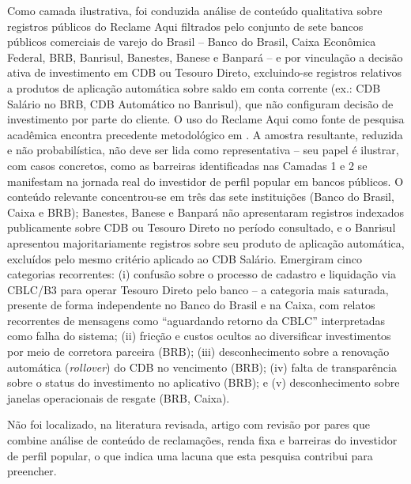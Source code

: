 Como camada ilustrativa, foi conduzida an\'alise de conte\'udo qualitativa
\autocite{bardin2011} sobre registros p\'ublicos do Reclame Aqui filtrados
pelo conjunto de sete bancos p\'ublicos comerciais de varejo do Brasil --
Banco do Brasil, Caixa Econ\^omica Federal, BRB, Banrisul, Banestes,
Banese e Banpar\'a -- e por vincula\c{c}\~ao a decis\~ao ativa de
investimento em CDB ou Tesouro Direto, excluindo-se registros relativos a
produtos de aplica\c{c}\~ao autom\'atica sobre saldo em conta corrente
(ex.: CDB Sal\'ario no BRB, CDB Autom\'atico no Banrisul), que n\~ao
configuram decis\~ao de investimento por parte do cliente. O uso do
Reclame Aqui como fonte de pesquisa acad\^emica encontra precedente
metodol\'ogico em \textcite{rimolimelo2018}. A amostra resultante,
reduzida e n\~ao probabil\'istica, n\~ao deve ser lida como
representativa -- seu papel \'e ilustrar, com casos concretos, como as
barreiras identificadas nas Camadas 1 e 2 se manifestam na jornada real
do investidor de perfil popular em bancos p\'ublicos. O conte\'udo
relevante concentrou-se em tr\^es das sete institui\c{c}\~oes (Banco do
Brasil, Caixa e BRB); Banestes, Banese e Banpar\'a n\~ao apresentaram
registros indexados publicamente sobre CDB ou Tesouro Direto no per\'iodo
consultado, e o Banrisul apresentou majoritariamente registros sobre seu
produto de aplica\c{c}\~ao autom\'atica, exclu\'idos pelo mesmo crit\'erio
aplicado ao CDB Sal\'ario. Emergiram cinco categorias recorrentes: (i)
confus\~ao sobre o processo de cadastro e liquida\c{c}\~ao via CBLC/B3
para operar Tesouro Direto pelo banco -- a categoria mais saturada,
presente de forma independente no Banco do Brasil e na Caixa, com relatos
recorrentes de mensagens como ``aguardando retorno da CBLC'' interpretadas
como falha do sistema; (ii) fric\c{c}\~ao e custos ocultos ao diversificar
investimentos por meio de corretora parceira (BRB); (iii) desconhecimento
sobre a renova\c{c}\~ao autom\'atica (\textit{rollover}) do CDB no
vencimento (BRB); (iv) falta de transpar\^encia sobre o status do
investimento no aplicativo (BRB); e (v) desconhecimento sobre janelas
operacionais de resgate (BRB, Caixa).

N\~ao foi localizado, na literatura revisada, artigo com revis\~ao por
pares que combine an\'alise de conte\'udo de reclama\c{c}\~oes, renda
fixa e barreiras do investidor de perfil popular, o que indica uma
lacuna que esta pesquisa contribui para preencher.


